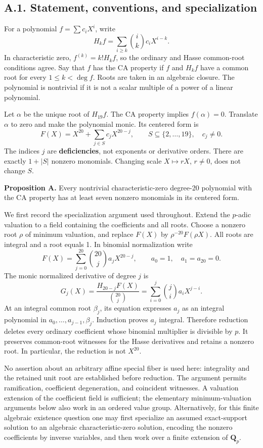 \documentclass[
  british,
  10pt,
  a4paper,
]{article}
\begin{document}
\subsection*{A.1. Statement, conventions, and
specialization}\label{a.1.-statement-conventions-and-specialization}

For a polynomial \(f=\sum c_iX^i\), write \[
H_kf=\sum_{i\ge k}\binom{i}{k}c_iX^{i-k}.
\] In characteristic zero, \(f^{(k)}=k!H_kf\), so the ordinary and Hasse
common-root conditions agree. Say that \(f\) has the CA property if
\(f\) and \(H_kf\) have a common root for every \(1\le k<\deg f\). Roots
are taken in an algebraic closure. The polynomial is nontrivial if it is
not a scalar multiple of a power of a linear polynomial.

Let \(\alpha\) be the unique root of \(H_{19}f\). The CA property
implies \(f(\alpha)=0\). Translate \(\alpha\) to zero and make the
polynomial monic. Its centered form is \[
F(X)=X^{20}+\sum_{j\in S}c_jX^{20-j},
\qquad S\subseteq\{2,\ldots,19\},\quad c_j\ne0.
\tag{S1}
\] The indices \(j\) are \textbf{deficiencies}, not exponents or
derivative orders. There are exactly \(1+|S|\) nonzero monomials.
Changing scale \(X\mapsto rX\), \(r\ne0\), does not change \(S\).

\textbf{Proposition A.} Every nontrivial characteristic-zero degree-20
polynomial with the CA property has at least seven nonzero monomials in
its centered form.

We first record the specialization argument used throughout. Extend the
\(p\)-adic valuation to a field containing the coefficients and all
roots. Choose a nonzero root \(\rho\) of minimum valuation, and replace
\(F(X)\) by \(\rho^{-20}F(\rho X)\). All roots are integral and a root
equals 1. In binomial normalization write \[
F(X)=\sum_{j=0}^{20}\binom{20}{j}a_jX^{20-j},
\qquad a_0=1,\quad a_1=a_{20}=0.
\] The monic normalized derivative of degree \(j\) is \[
G_j(X)=\frac{H_{20-j}F(X)}{\binom{20}{j}}
      =\sum_{i=0}^{j}\binom ji a_iX^{j-i}.
\] At an integral common root \(\beta_j\), its equation expresses
\(a_j\) as an integral polynomial in \(a_0,\ldots,a_{j-1},\beta_j\).
Induction proves \(a_j\) integral. Therefore reduction deletes every
ordinary coefficient whose binomial multiplier is divisible by \(p\). It
preserves common-root witnesses for the Hasse derivatives and retains a
nonzero root. In particular, the reduction is not \(X^{20}\).

No assertion about an arbitrary affine special fiber is used here:
integrality and the retained unit root are established before reduction.
The argument permits ramification, coefficient degeneration, and
coincident witnesses. A valuation extension of the coefficient field is
sufficient; the elementary minimum-valuation arguments below also work
in an ordered value group. Alternatively, for this finite algebraic
existence question one may first specialize an assumed exact-support
solution to an algebraic characteristic-zero solution, encoding the
nonzero coefficients by inverse variables, and then work over a finite
extension of \(\mathbf Q_p\).
\end{document}

